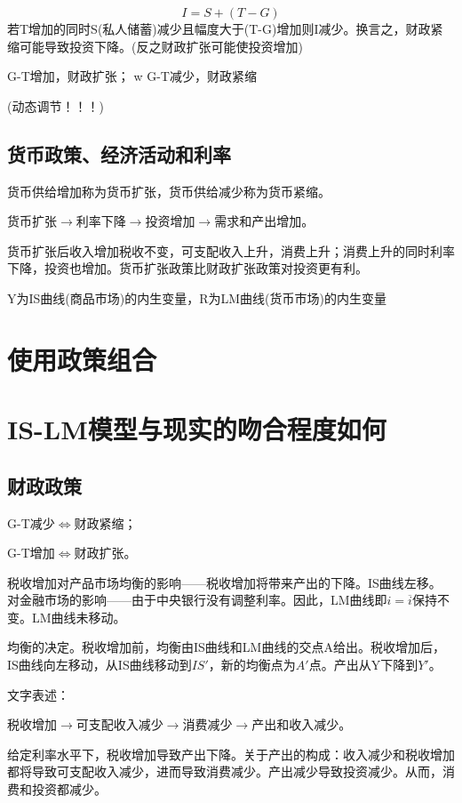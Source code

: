 \documentclass{article}
\begin{document}
\[
I=S+(T-G)
\]
若T增加的同时S(私人储蓄)减少且幅度大于(T-G)增加则I减少。换言之，财政紧缩可能导致投资下降。(反之财政扩张可能使投资增加)

G-T增加，财政扩张；
	w
G-T减少，财政紧缩

(动态调节！！！)

\subsection{货币政策、经济活动和利率}
货币供给增加称为货币扩张，货币供给减少称为货币紧缩。

货币扩张$ \rightarrow $利率下降$ \rightarrow $投资增加$ \rightarrow $需求和产出增加。

货币扩张后收入增加税收不变，可支配收入上升，消费上升；消费上升的同时利率下降，投资也增加。货币扩张政策比财政扩张政策对投资更有利。

Y为IS曲线(商品市场)的内生变量，R为LM曲线(货币市场)的内生变量

\section{使用政策组合}

\section{IS-LM模型与现实的吻合程度如何}
\fi





\subsection{财政政策}

G-T减少$\Leftrightarrow$财政紧缩；

G-T增加$\Leftrightarrow$财政扩张。

税收增加对产品市场均衡的影响——税收增加将带来产出的下降。IS曲线左移。
对金融市场的影响——由于中央银行没有调整利率。因此，LM曲线即$ i=\overline{i} $保持不变。LM曲线未移动。

均衡的决定。税收增加前，均衡由IS曲线和LM曲线的交点A给出。税收增加后，IS曲线向左移动，从IS曲线移动到$ IS' $，新的均衡点为$ A' $点。产出从Y下降到$ Y' $。

文字表述：

税收增加$ \rightarrow $可支配收入减少$ \rightarrow $消费减少$ \rightarrow $产出和收入减少。

给定利率水平下，税收增加导致产出下降。关于产出的构成：收入减少和税收增加都将导致可支配收入减少，进而导致消费减少。产出减少导致投资减少。从而，消费和投资都减少。
\end{document}
